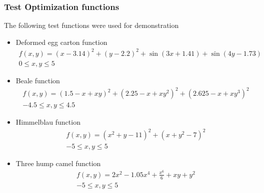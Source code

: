 
\begin{frame}
    \frametitle{Test Optimization functions}
    \tiny
    The following test functions were used for demonstration
    \begin{itemize}
        \item Deformed egg carton function
            \begin{align*}
                f(x,y) = (x-3.14)^2 + (y-2.2)^2 +\sin(3 x+1.41) + \sin(4 y - 1.73) \\
                0 \le x,y \le 5
            \end{align*}
        \item Beale function
            \begin{align*}
                f(x,y) = (1.5-x+xy)^2+(2.25-x+x y^2)^2 + (2.625 -x+xy^3)^2 \\
                -4.5 \le x,y \le 4.5
            \end{align*}
        \item Himmelblau function
            \begin{align*}
                f(x,y) = (x^2+y-11)^2+(x+y^2-7)^2 \\
                -5 \le x,y \le 5
            \end{align*}
        \item Three hump camel function
            \begin{align*}
                f(x,y) = 2 x^2 -1.05x^4+\frac{x^6}{6}+x y +y^2 \\
                -5 \le x,y \le 5
            \end{align*}
    \end{itemize}
\end{frame}

